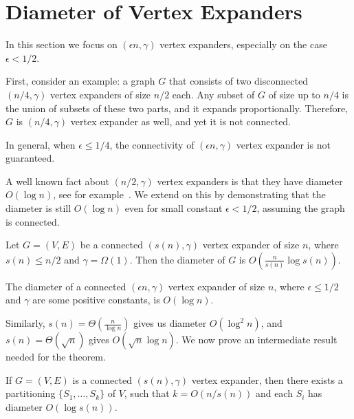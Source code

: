 \section{Diameter of Vertex Expanders}

In this section we focus on $(\epsilon n,\gamma)$ vertex expanders,
especially on the case $\epsilon<1/2$.

First, consider an example: a graph $G$ that consists of two disconnected
$(n/4,\gamma)$ vertex expanders of size $n/2$ each.
Any subset of $G$ of size up to $n/4$ is the union of subsets of these two parts,
and it expands proportionally.
Therefore, $G$ is $(n/4,\gamma)$ vertex expander as well,
and yet it is not connected.

In general, when $\epsilon\leq1/4$, the connectivity of
$(\epsilon n,\gamma)$ vertex expander is not guaranteed.

A well known fact about $(n/2,\gamma)$ vertex expanders is that
they have diameter $O(\log n)$, see for example~\cite{rao12,hlw06}.
We extend on this by demonstrating that the diameter is still $O(\log n)$
even for small constant $\epsilon<1/2$, assuming the graph is connected.

\begin{theorem}
    \label{thm:vertex-expander-diameter}
    Let $G=(V,E)$ be a connected $(s(n),\gamma)$ vertex expander of size $n$,
    where $s(n)\leq n/2$ and $\gamma=\Omega(1)$.
    Then the diameter of $G$ is $O\left(\frac{n}{s(n)}\log s(n)\right)$.
\end{theorem}

\begin{corollary}
    The diameter of a connected $(\epsilon n,\gamma)$ vertex expander of size $n$,
    where $\epsilon\leq1/2$ and $\gamma$ are some positive constants, is $O(\log n)$.
\end{corollary}

Similarly, $s(n)=\Theta\left(\frac{n}{\log n}\right)$ gives us
diameter $O\left(\log^2n\right)$,
and $s(n)=\Theta(\sqrt{n})$ gives $O\left(\sqrt{n}\log n\right)$.
We now prove an intermediate result needed for the theorem.

\begin{lemma}
    \label{lem:vertex-expander-partitioning}
    If $G=(V,E)$ is a connected $(s(n),\gamma)$ vertex expander,
    then there exists a partitioning $\{S_1,\ldots,S_k\}$ of $V$,
    such that $k=O(n/s(n))$ and each $S_i$ has diameter $O(\log s(n))$.
\end{lemma}

